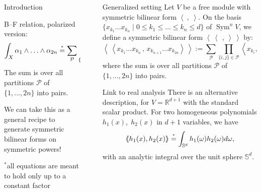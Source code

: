 \documentclass[final]{beamer}
\newlength{\sepwid}
\newlength{\onecolwid}
\DeclareMathOperator{\Sym}{Sym}
\newcommand{\coloneqq}{:=}
\newcommand{\bra}{\left<\!\!\!\:\left<}
\newcommand{\ket}{\right>\!\!\!\:\right>}
\newcommand{\myeq}[1]{\mathrel{\overset{\makebox[0pt]{\text{\tiny #1}}}{=}}}
\newcommand{\stareq}{\myeq{*}}
\newcommand{\R}{\mathbb{R}}
\renewcommand{\S}{\mathbb{S}}
\begin{document}
\begin{frame}[t]
\begin{columns}[t]
\begin{column}{\onecolwid}
\begin{block}{Introduction}
\begin{alertblock}{B--F relation, polarized version:}
$$
\int_X \alpha_1\wedge\ldots \wedge\alpha_{2n} \stareq\sum_{\mathcal{P}} \prod_{\{i,j\}\in\mathcal{P}} \left<\alpha_i,\alpha_j\right>.
$$
The sum is over all partitions $\mathcal{P}$ of $\{1,\ldots,2n\}$ into pairs.
\end{alertblock}
We can take this as a general recipe to generate symmetric bilinear forms on symmetric powers!
\vspace{55mm}
\begin{flushright}
${}^*$all equations are meant to hold only up to a constant factor
\end{flushright}
\end{block}






\end{column} %


\begin{column}{\sepwid}\end{column} %

\begin{column}{\onecolwid} %

\begin{block}{Generalized setting}
Let $V$ be a free module with symmetric bilinear form $\left<\ ,\;\right>$.
On the basis $\{x_{k_1}\ldots x_{k_n}\;|\;0\leq k_1\leq\ldots\leq k_n\leq d\}$ of $\Sym^nV$, we define a symmetric bilinear form $\bra\ \,,\ \ket$ by: 
\begin{equation*}
\label{mydef}
\bra x_{k_1}\ldots x_{k_n}\,,\,x_{k_{n+1}}\ldots x_{k_{2n}} \ket \coloneqq \sum_{\mathcal{P}} \prod_{\{i,j\}\in\mathcal{P}} \left<x_{k_i},x_{k_j}\right>,
\end{equation*}
where the sum is over all partitions $\mathcal{P}$ of $\{1,\ldots,2n\}$ into pairs.
\end{block}

\begin{block}{Link to real analysis}
There is an alternative description, for $V=\R^{d+1}$ with the standard scalar product.
For two homogeneous polynomials $h_1(x),\;h_2(x)$ in $d+1$ variables, we have
$$
\bra h_1(x), h_2(x) \ket \stareq \int_{\S^d}  h_1(\omega) h_2(\omega) d\omega ,
$$ 
with an analytic integral over the unit sphere $\S^d$.


\end{block}
\end{column}
\end{columns}
\end{frame}
\end{document}
